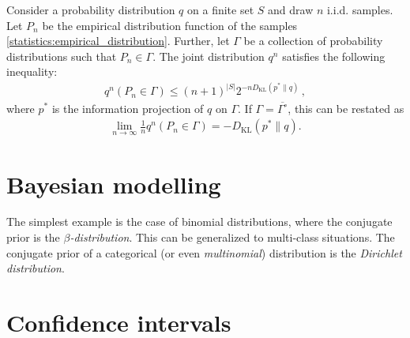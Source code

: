     \begin{theorem}[Sanov]
        Consider a probability distribution $q$ on a finite set $S$ and draw $n$ i.i.d. samples. Let $P_n$ be the empirical distribution function of the samples \eqref{statistics:empirical_distribution}. Further, let $\Gamma$ be a collection of probability distributions such that $P_n\in\Gamma$. The joint distribution $q^n$ satisfies the following inequality:
        \begin{gather}
            q^n(P_n\in\Gamma) \leq (n+1)^{|S|}2^{-n D_\mathrm{KL}(p^*\|q)}\,,
        \end{gather}
        where $p^*$ is the information projection of $q$ on $\Gamma$. If $\Gamma=\overline{\Gamma^\circ}$, this can be restated as
        \begin{gather}
            \lim_{n\rightarrow\infty}\frac{1}{n}q^n(P_n\in\Gamma) = - D_\mathrm{KL}(p^*\|q).
        \end{gather}
    \end{theorem}

\section{Bayesian modelling}

    \begin{example}
        The simplest example is the case of binomial distributions, where the conjugate prior is the \textit{$\beta$-distribution}. This can be generalized to multi-class situations. The conjugate prior of a categorical (or even \textit{multinomial}) distribution is the \textit{Dirichlet distribution}.
    \end{example}

\section{Confidence intervals}\label{section:confidence}


